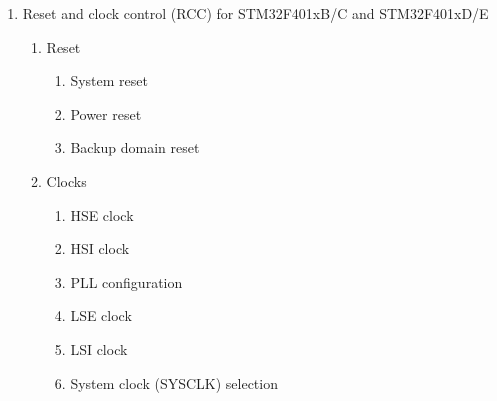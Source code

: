 \documentclass{article}
\begin{document}
\begin{enumerate}
\begin{enumerate}
        \begin{enumerate}
            \item Slowing down system clocks 
            \item Peripheral clock gating 
            \item Sleep mode 
            \item Stop mode 
            \item Standby mode 
            \item Programming the RTC alternate functions to wake up the device from the Stop and Standby modes 
        \end{enumerate}
        \item Power control registers 
        \begin{enumerate}
            \item PWR power control register (PWR\_CR) 
            \item PWR power control/status register (PWR\_CSR) 
            \item PWR register map 
        \end{enumerate}
    \end{enumerate}
    \item Reset and clock control (RCC) for STM32F401xB/C and STM32F401xD/E 
    \begin{enumerate}
        \item Reset 
        \begin{enumerate}
            \item System reset 
            \item Power reset 
            \item Backup domain reset 
        \end{enumerate}
        \item Clocks 
        \begin{enumerate}
            \item HSE clock 
            \item HSI clock 
            \item PLL configuration 
            \item LSE clock 
            \item LSI clock 
            \item System clock (SYSCLK) selection 

\end{enumerate}
\end{enumerate}
\end{enumerate}
\end{document}
